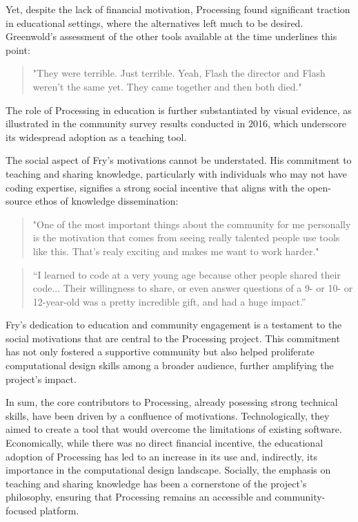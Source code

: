 Yet, despite the lack of financial motivation, Processing found significant traction in educational settings, where the alternatives left much to be desired. Greenwold’s assessment of the other tools available at the time underlines this point:
	
\begin{quote}
"They were terrible. Just terrible. Yeah, Flash the director and Flash weren't the same yet. They came together and then both died." 
\end{quote}

The role of Processing in education is further substantiated by visual evidence, as illustrated in the community survey results conducted in 2016, which underscore its widespread adoption as a teaching tool.

The social aspect of Fry’s motivations cannot be understated. His commitment to teaching and sharing knowledge, particularly with individuals who may not have coding expertise, signifies a strong social incentive that aligns with the open-source ethos of knowledge dissemination:

\begin{quote}
	"One of the most important things about the community for me personally is the motivation that comes from seeing really talented people use tools like this. That's realy exciting and makes me want to work harder."
\end{quote}
\begin{quote}
“I learned to code at a very young age because other people shared their code... Their willingness to share, or even answer questions of a 9- or 10- or 12-year-old was a pretty incredible gift, and had a huge impact.” 
\end{quote}

Fry’s dedication to education and community engagement is a testament to the social motivations that are central to the Processing project. This commitment has not only fostered a supportive community but also helped proliferate computational design skills among a broader audience, further amplifying the project's impact.

In sum, the core contributors to Processing, already posessing strong technical skills, have been driven by a confluence of motivations. Technologically, they aimed to create a tool that would overcome the limitations of existing software. Economically, while there was no direct financial incentive, the educational adoption of Processing has led to an increase in its use and, indirectly, its importance in the computational design landscape. Socially, the emphasis on teaching and sharing knowledge has been a cornerstone of the project’s philosophy, ensuring that Processing remains an accessible and community-focused platform.


